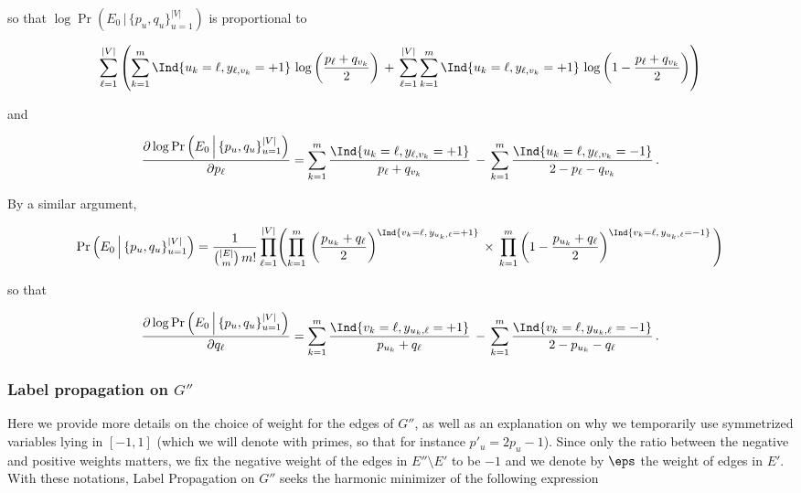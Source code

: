 so that $\log \Pr\left(E_0\,\Big|\, \{p_u, q_u\}_{u=1}^{|V|}\right)$ is proportional to

\begin{equation*}
  \sum_{\ell=1}^{|V|}\left(\sum_{k=1}^m \Ind{u_k = \ell,y_{\ell,v_k}=+1}\,
  \log\left(\frac{p_{\ell}+q_{v_k}}{2} \right)\, +\,
  \sum_{\ell=1}^{|V|}\sum_{k=1}^m \Ind{u_k = \ell,y_{\ell,v_k}=+1}\, 
\log\left(1-\frac{p_{\ell}+q_{v_k}}{2} \right)\right)
\end{equation*}

and

\begin{equation*}
  \frac{\partial \log \Pr\left(E_0\,\Big|\, \{p_u, q_u\}_{u=1}^{|V|}\right)}{\partial p_{\ell}}
  = \sum_{k=1}^m 
  \frac{\Ind{u_k = \ell,y_{\ell,v_k}=+1}}{p_{\ell}+q_{v_k}}\,
   - \,
  \sum_{k=1}^m \frac{\Ind{u_k = \ell,y_{\ell,v_k}=-1}}{2-p_{\ell}-q_{v_k}}\,.
\end{equation*}

By a similar argument,

\begin{align*}
  \Pr\left(E_0\,\Big|\, \{p_u, q_u\}_{u=1}^{|V|}\right) 
=
  \frac{1}{\binom{|E|}{m}\,m!}
  \prod_{\ell=1}^{|V|}\Biggl(\prod_{k=1}^m\,
    \left(\frac{p_{u_k}+q_{\ell}}{2} \right)^{\Ind{v_k = \ell,\,y_{u_k,\ell}=+1}}\,
\times\,
    \prod_{k=1}^m\left(1-\frac{p_{u_k}+q_{\ell}}{2} \right)^{\Ind{v_k = \ell,\,y_{u_k,\ell}=-1}}\Biggl)
\end{align*}

so that

\begin{align*}
\frac{\partial \log \Pr\left(E_0\,\Big|\, \{p_u, q_u\}_{u=1}^{|V|}\right)}{\partial q_{\ell}}
= \sum_{k=1}^m \frac{\Ind{v_k = \ell,y_{u_k,\ell}=+1}}{p_{u_k}+q_{\ell}}\,
- \, \sum_{k=1}^m \frac{\Ind{v_k = \ell,y_{u_k,\ell}=-1}}{2-p_{u_k}-q_{\ell}}\,.
\end{align*}

\subsubsection{Label propagation on $G''$}
\label{ssec:troll_lprop_weights}

Here we provide more details on the choice of weight for the edges of $G''$, as well as an
explanation on why we temporarily use symmetrized variables lying in $[-1, 1]$ (which we will denote
with primes, so that for instance $p'_u = 2p_u-1$). Since only the ratio between the negative and
positive weights matters, we fix the negative weight of the edges in $E''\setminus E'$ to be $-1$
and we denote by $\eps$ the weight of edges in $E'$.  With these notations, Label Propagation on
$G''$ seeks the harmonic minimizer of the following expression 

